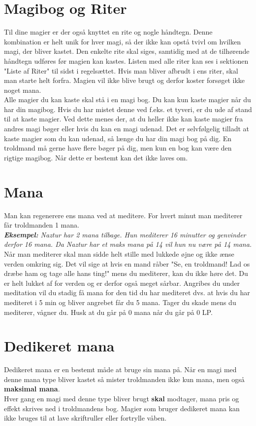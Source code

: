 \section{Magibog og Riter}
Til dine magier er der også knyttet en rite og nogle håndtegn. Denne kombination er helt unik for hver magi, så der ikke kan opstå tvivl om hvilken magi, der bliver kastet. Den enkelte rite skal siges, samtidig med at de tilhørende håndtegn udføres før magien kan kastes. Listen med alle riter kan ses i sektionen "Liste af Riter" til sidst i regelsættet. Hvis man bliver afbrudt i ens riter, skal man starte helt forfra. Magien vil ikke blive brugt og derfor koster forsøget ikke noget mana.\\
Alle magier du kan kaste skal stå i en magi bog. Du kan kun kaste magier når du har din magibog. Hvis du har mistet denne ved f.eks. et tyveri, er du ude af stand til at kaste magier. Ved dette menes der, at du heller ikke kan kaste magier fra andres magi bøger eller hvis du kan en magi udenad. Det er selvfølgelig tilladt at kaste magier som du kan udenad, så længe du har din magi bog på dig. En troldmand må gerne have flere bøger på dig, men kun en bog kan være den rigtige magibog. Når dette er bestemt kan det ikke laves om.


\section{Mana}
Man kan regenerere ens mana ved at meditere. For hvert minut man mediterer får troldmanden 1
mana.\\
\textit{\textbf{Eksempel:} Naztur har 2 mana tilbage. Hun mediterer 16 minutter og genvinder derfor 16 mana. Da Naztur har et maks mana på 14 vil hun nu være på 14 mana.}\\
Når man mediterer skal man sidde helt stille med lukkede øjne og ikke ænse verden omkring sig. Det
vil sige at hvis en mand råber "Se, en troldmand! Lad os dræbe ham og tage alle hans ting!" mens du mediterer, kan du ikke høre det. Du er helt lukket af for verden og er derfor også meget sårbar. Angribes du under meditation vil du stadig få mana for den tid du har mediteret dvs. at hvis du har mediteret i 5 min og bliver angrebet får du 5 mana. Tager du skade mens du mediterer, vågner du. Husk at du går på 0 mana når du går på 0 LP.


\section{Dedikeret mana}
Dedikeret mana er en bestemt måde at bruge sin mana på. Når en magi med denne mana type bliver kastet så mister troldmanden ikke kun mana, men også \textbf{maksimal mana}.\\ Hver gang en magi med denne type bliver brugt \textbf{skal} modtager, mana pris og effekt skrives ned i troldmandens bog. Magier som bruger dedikeret mana kan ikke bruges til at lave skriftruller eller fortrylle våben.\\

